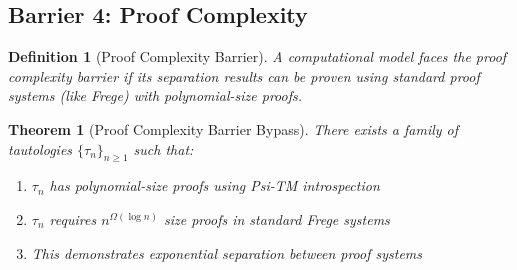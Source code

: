 \documentclass[11pt]{article}
\newtheorem{definition}{Definition}
\newtheorem{theorem}{Theorem}
\begin{document}
\subsection{Barrier 4: Proof Complexity}

\begin{definition}[Proof Complexity Barrier]
A computational model faces the proof complexity barrier if its separation results can be proven using standard proof systems (like Frege) with polynomial-size proofs.
\end{definition}

\begin{theorem}[Proof Complexity Barrier Bypass]
There exists a family of tautologies $\{\tau_n\}_{n \geq 1}$ such that:
\begin{enumerate}
\item $\tau_n$ has polynomial-size proofs using Psi-TM introspection
\item $\tau_n$ requires $n^{\Omega(\log n)}$ size proofs in standard Frege systems
\item This demonstrates exponential separation between proof systems
\end{enumerate}
\end{theorem}
\end{document}
